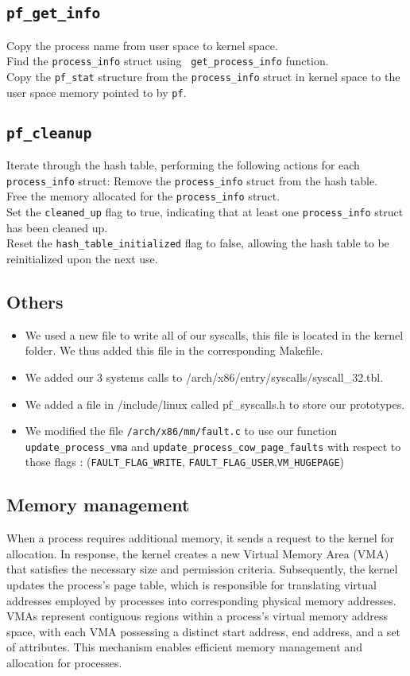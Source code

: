 \documentclass{article}
\begin{document}
\subsection{\texttt{pf\_get\_info}}
 Copy the process name from user space to kernel space. \\
Find the \texttt{process\_info} struct using \texttt{ get\_process\_info} function.\\
Copy the \texttt{pf\_stat} structure from the \texttt{process\_info} struct in kernel space to the user space memory pointed to by \texttt{pf}.\\
\subsection{\texttt{pf\_cleanup}}
Iterate through the hash table, performing the following actions for each \texttt{process\_info} struct:
    Remove the \texttt{process\_info} struct from the hash table. \\
    Free the memory allocated for the \texttt{process\_info} struct.\\
    Set the \texttt{cleaned\_up} flag to true, indicating that at least one \texttt{process\_info} struct has been cleaned up.\\
    Reset the \texttt{hash\_table\_initialized} flag to false, allowing the hash table to be reinitialized upon the next use.\\
\subsection{Others}
\begin{itemize}
    \item We used a new file to write all of our syscalls, this file is located in the kernel folder. We thus added this file in the corresponding Makefile.
    \item We added our 3 systems calls to /arch/x86/entry/syscalls/syscall\_32.tbl.
    \item We added a file in /include/linux called pf\_syscalls.h to store our prototypes.
    \item We modified the file \texttt{/arch/x86/mm/fault.c} to use our function \texttt{update\_process\_vma} and \texttt{update\_process\_cow\_page\_faults} with respect to those flags : (\texttt{FAULT\_FLAG\_WRITE}, \texttt{FAULT\_FLAG\_USER},\texttt{VM\_HUGEPAGE})
\end{itemize}
\subsection{Memory management}
When a process requires additional memory, it sends a request to the kernel for allocation. In response, the kernel creates a new Virtual Memory Area (VMA) that satisfies the necessary size and permission criteria. Subsequently, the kernel updates the process's page table, which is responsible for translating virtual addresses employed by processes into corresponding physical memory addresses. VMAs represent contiguous regions within a process's virtual memory address space, with each VMA possessing a distinct start address, end address, and a set of attributes. This mechanism enables efficient memory management and allocation for processes.
\end{document}

